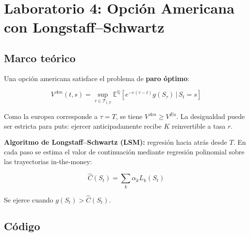 \documentclass[12pt,letterpaper]{article}
\begin{document}
\section{Laboratorio 4: Opci\'on Americana con Longstaff--Schwartz}

\subsection{Marco te\'orico}

Una opci\'on americana satisface el problema de \textbf{paro \'optimo}:

\begin{equation}
  V^{Am}(t, s) = \sup_{\tau \in \mathcal{T}_{t,T}}
    \mathbb{E}^\mathbb{Q}\!\left[e^{-r(\tau-t)} g(S_\tau) \,\Big|\, S_t = s\right]
\end{equation}

Como la europea corresponde a $\tau = T$, se tiene $V^{Am} \geq V^{Eu}$.
La desigualdad puede ser estricta para puts: ejercer anticipadamente recibe $K$
reinvertible a tasa $r$.

\textbf{Algoritmo de Longstaff--Schwartz (LSM):} regresi\'on hacia atr\'as desde $T$.
En cada paso se estima el valor de continuaci\'on mediante regresi\'on polinomial
sobre las trayectorias in-the-money:

\begin{equation}
  \hat{C}(S_t) = \sum_{k} \alpha_k L_k(S_t)
\end{equation}

Se ejerce cuando $g(S_t) > \hat{C}(S_t)$.

\subsection{C\'odigo}
\end{document}
